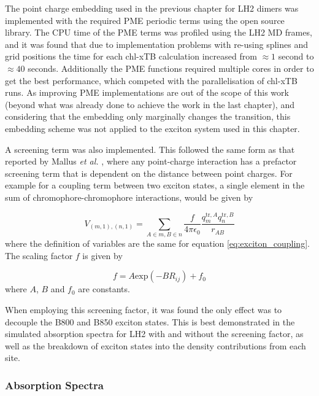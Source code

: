 The point charge embedding used in the previous chapter for LH2 dimers was implemented 
with the required PME periodic terms using the open source  library.
The CPU time of the PME terms was profiled using the LH2 MD frames, and it was found
that due to implementation problems with re-using splines and grid positions the
time for each chl-xTB calculation increased from $\approx 1$ second to $\approx 40$
seconds. Additionally the PME functions required multiple cores in order to get
the best performance, which competed with the parallelisation of chl-xTB runs. As
improving PME implementations are out of the scope of this work (beyond what was 
already done to achieve the work in the last chapter), and considering that the
embedding only marginally changes the \Qy transition, this embedding scheme was
not applied to the exciton system used in this chapter.

A screening term was also implemented. This followed the same form as that reported
by Mallus \emph{et al.} \cite{Mallus2018}, where any point-charge interaction has
a prefactor screening term that is dependent on the distance between point charges.
For example for a coupling term between two exciton states, a single element in 
the sum of chromophore-chromophore interactions, would be given by

\begin{equation}
    V_{\left(m, 1\right), \left(n,1\right)} = \sum_{A \in m, B \in n} \frac{f}{4\pi\epsilon_0} \frac{q^{\text{tr},A}_m q^{\text{tr},B}_n}{r_{AB}}
    \label{eq:exciton_coupling}
\end{equation}
%
where the definition of variables are the same for equation \ref{eq:exciton_coupling}.
The scaling factor $f$ is given by

\begin{equation}
    f = A \text{exp}\left(-B R_{ij}\right) + f_0
\end{equation}
%
where $A$, $B$ and $f_0$ are constants. 

When employing this screening factor, it was found the only effect was to decouple
the B800 and B850 exciton states. This is best demonstrated in the simulated absorption
spectra for LH2 with and without the screening factor, as well as the breakdown 
of exciton states into the density contributions from each site.

\subsubsection{Absorption Spectra}
\label{subsubsec:abs_spec}

